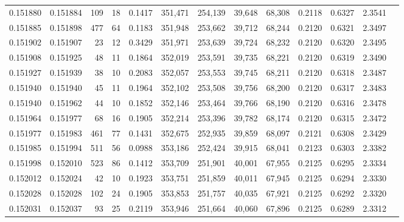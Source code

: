 \begin{tabular}{rrrrrrrrrrrrr}
0.151880 & 0.151884 &   109 &  18 &                                     0.1417 & 351,471 & 254,139 &  39,648 &  68,308 & 0.2118 & 0.6327 & 2.3541 \\
0.151885 & 0.151898 &   477 &  64 &                                     0.1183 & 351,948 & 253,662 &  39,712 &  68,244 & 0.2120 & 0.6321 & 2.3497 \\
0.151902 & 0.151907 &    23 &  12 &                                     0.3429 & 351,971 & 253,639 &  39,724 &  68,232 & 0.2120 & 0.6320 & 2.3495 \\
0.151908 & 0.151925 &    48 &  11 &                                     0.1864 & 352,019 & 253,591 &  39,735 &  68,221 & 0.2120 & 0.6319 & 2.3490 \\
0.151927 & 0.151939 &    38 &  10 &                                     0.2083 & 352,057 & 253,553 &  39,745 &  68,211 & 0.2120 & 0.6318 & 2.3487 \\
0.151940 & 0.151940 &    45 &  11 &                                     0.1964 & 352,102 & 253,508 &  39,756 &  68,200 & 0.2120 & 0.6317 & 2.3483 \\
0.151940 & 0.151962 &    44 &  10 &                                     0.1852 & 352,146 & 253,464 &  39,766 &  68,190 & 0.2120 & 0.6316 & 2.3478 \\
0.151964 & 0.151977 &    68 &  16 &                                     0.1905 & 352,214 & 253,396 &  39,782 &  68,174 & 0.2120 & 0.6315 & 2.3472 \\
0.151977 & 0.151983 &   461 &  77 &                                     0.1431 & 352,675 & 252,935 &  39,859 &  68,097 & 0.2121 & 0.6308 & 2.3429 \\
0.151985 & 0.151994 &   511 &  56 &                                     0.0988 & 353,186 & 252,424 &  39,915 &  68,041 & 0.2123 & 0.6303 & 2.3382 \\
0.151998 & 0.152010 &   523 &  86 &                                     0.1412 & 353,709 & 251,901 &  40,001 &  67,955 & 0.2125 & 0.6295 & 2.3334 \\
0.152012 & 0.152024 &    42 &  10 &                                     0.1923 & 353,751 & 251,859 &  40,011 &  67,945 & 0.2125 & 0.6294 & 2.3330 \\
0.152028 & 0.152028 &   102 &  24 &                                     0.1905 & 353,853 & 251,757 &  40,035 &  67,921 & 0.2125 & 0.6292 & 2.3320 \\
0.152031 & 0.152037 &    93 &  25 &                                     0.2119 & 353,946 & 251,664 &  40,060 &  67,896 & 0.2125 & 0.6289 & 2.3312 \\

\end{tabular}
